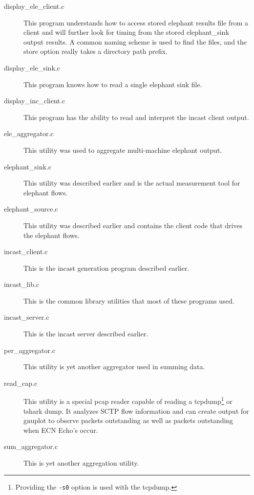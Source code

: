 \documentclass[12pt]{article}
\begin{document}
\begin{description}

\item[display\_ele\_client.c] This program understands how to access stored elephant results file from a
client and will further look for timing from the stored elephant\_sink output results. A common naming
scheme is used to find the files, and the store option really takes a directory path prefix. 

\item[display\_ele\_sink.c] This program knows how to read a single elephant sink file.

\item [display\_inc\_client.c] This program has the ability to read and interpret the incast client output.

\item [ele\_aggregator.c] This utility was used to aggregate multi-machine elephant output.

\item [elephant\_sink.c] This utility was described earlier and is the actual measurement tool for elephant flows.

\item [elephant\_source.c] This utility was described earlier and contains the client code that drives the elephant
flows.

\item [incast\_client.c] This is the incast generation program described earlier.

\item [incast\_lib.c] This is the common library utilities that most of these programs used.

\item [incast\_server.c] This is the incast server described earlier.

\item [per\_aggregator.c] This utility is yet another aggregator used in summing data.

\item [read\_cap.c] This utility is a special pcap reader capable of reading a tcpdump\footnote{Providing the
\texttt{-s0} option is used with the tcpdump.} or tshark dump. It analyzes SCTP flow information and can create output for gnuplot
to observe packets outstanding as well as packets outstanding when ECN Echo's occur.

\item [sum\_aggregator.c] This is yet another aggregation utility.

\end{description}
\end{document}
